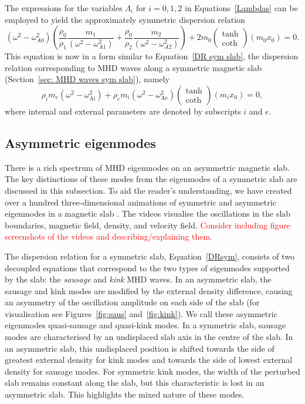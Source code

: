 \documentclass[12pt]{../style-files/ociamthesis}
\begin{document}
The expressions for the variables $\Lambda_i$ for $i=0,1,2$ in Equations~\eqref{Lambdas} can be employed to yield the approximately symmetric dispersion relation
\begin{equation}
(\omega^2 - \omega_{A0}^2)\left(\frac{\rho_0}{\rho_1}\frac{m_1}{(\omega^2 - \omega_{A1}^2)} + \frac{\rho_0}{\rho_2}\frac{m_2}{(\omega^2 - \omega_{A2}^2)}\right) + 2m_0\left(\begin{matrix}\tanh \\ \coth \end{matrix}\right)(m_0x_0) = 0. \label{DR approx}
\end{equation}
This equation is now in a form similar to Equation~\eqref{DR sym slab}, the dispersion relation corresponding to MHD waves along a symmetric magnetic slab (Section~\ref{sec: MHD waves sym slab}), namely
\begin{equation}
\rho_im_e(\omega^2 - \omega_\textrm{Ai}^2) + \rho_em_i(\omega^2 - \omega_\textrm{Ae}^2)\left(\begin{matrix}\tanh \\ \coth \end{matrix}\right)(m_ix_0) = 0, \label{DRsym}
\end{equation}
where internal and external parameters are denoted by subscripts $i$ and $e$.


\subsection{Asymmetric eigenmodes}
There is a rich spectrum of MHD eigenmodes on an asymmetric magnetic slab. The key distinctions of these modes from the eigenmodes of a symmetric slab are discussed in this subsection. To aid the reader's understanding, we have created over a hundred three-dimensional animations of symmetric and asymmetric eigenmodes in a magnetic slab \cite{all_etal18c}. The videos visualise the oscillations in the slab boundaries, magnetic field, density, and velocity field. \textcolor{red}{Consider including figure screenshots of the videos and describing/explaining them.}

The dispersion relation for a symmetric slab, Equation~\eqref{DRsym}, consists of two decoupled equations that correspond to the two types of eigenmodes supported by the slab: the \textit{sausage} and \textit{kink} MHD waves. In an asymmetric slab, the sausage and kink modes are modified by the external density difference, causing an asymmetry of the oscillation amplitude on each side of the slab (for visualisation see Figures~\ref{fig:saus} and~\ref{fig:kink}). We call these asymmetric eigenmodes quasi-sausage and quasi-kink modes. In a symmetric slab, sausage modes are characterised by an undisplaced slab axis in the centre of the slab. In an asymmetric slab, this undisplaced position is shifted towards the side of greatest external density for kink modes and towards the side of lowest external density for sausage modes. For symmetric kink modes, the width of the perturbed slab remains constant along the slab, but this characteristic is lost in an asymmetric slab. This highlights the mixed nature of these modes. 
\end{document}
